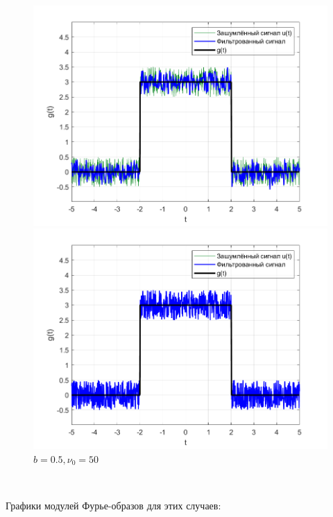 \documentclass[a4paper]{article}
\begin{document}
\begin{figure}[H]
    \begin{minipage}{0.5\textwidth}
        \centering
        \includegraphics[width=\textwidth]{part1/0.5_20.png}
        \caption{$b=0.5, \nu_0 = 20$}
    \end{minipage}    
    \begin{minipage}{0.5\textwidth}
        \centering
        \includegraphics[width=\textwidth]{part1/0.5_200.png}
        \caption{$b=0.5, \nu_0 = 50$}
    \end{minipage}
\end{figure}\ 

Графики модулей Фурье-образов для этих случаев:
\end{document}
